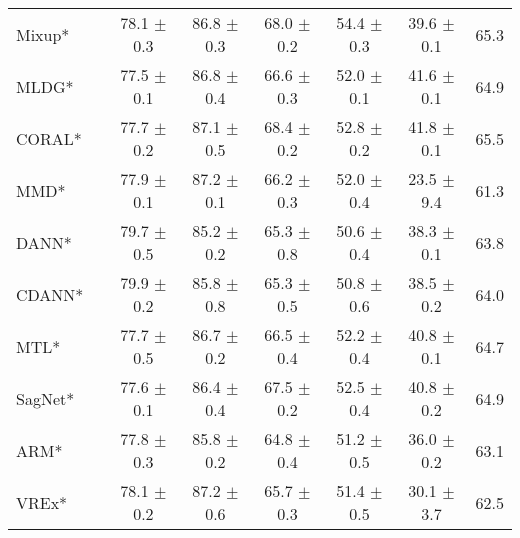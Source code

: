 \begin{table*}[t]
\begin{tabular}{llcccccc}
Mixup*               &   \citep{yan2020improve}            		 & 78.1 $\pm$ 0.3            & 86.8 $\pm$ 0.3            & 68.0 $\pm$ 0.2            & 54.4 $\pm$ 0.3            & 39.6 $\pm$ 0.1            & 65.3                      \\
MLDG*                 &  \citep{LiYSH18}           				& 77.5 $\pm$ 0.1            & 86.8 $\pm$ 0.4            & 66.6 $\pm$ 0.3            & 52.0 $\pm$ 0.1            & 41.6 $\pm$ 0.1            & 64.9                      \\
CORAL*                &  \citep{SunS16}           			  & 77.7 $\pm$ 0.2            & 87.1 $\pm$ 0.5            & 68.4 $\pm$ 0.2            & 52.8 $\pm$ 0.2            & 41.8 $\pm$ 0.1            & 65.5                      \\
MMD*               &   \citep{LiPWK18}               			& 77.9 $\pm$ 0.1            & 87.2 $\pm$ 0.1            & 66.2 $\pm$ 0.3            & 52.0 $\pm$ 0.4            & 23.5 $\pm$ 9.4            & 61.3                      \\
DANN*              &  \citep{GaninUAGLLML16}              		& 79.7 $\pm$ 0.5            & 85.2 $\pm$ 0.2            & 65.3 $\pm$ 0.8            & 50.6 $\pm$ 0.4            & 38.3 $\pm$ 0.1            & 63.8                      \\
CDANN*            &  \citep{LiTGLLZT18}              			& 79.9 $\pm$ 0.2            & 85.8 $\pm$ 0.8            & 65.3 $\pm$ 0.5            & 50.8 $\pm$ 0.6            & 38.5 $\pm$ 0.2            & 64.0                      \\
MTL*                  &  \citep{blanchard2017domain}           	  & 77.7 $\pm$ 0.5            & 86.7 $\pm$ 0.2            & 66.5 $\pm$ 0.4            & 52.2 $\pm$ 0.4            & 40.8 $\pm$ 0.1            & 64.7                      \\
SagNet*             &   \citep{nam2019reducing}           	& 77.6 $\pm$ 0.1            & 86.4 $\pm$ 0.4            & 67.5 $\pm$ 0.2            & 52.5 $\pm$ 0.4            & 40.8 $\pm$ 0.2            & 64.9                      \\
ARM*                  &   \citep{zhang2020adaptive}           		& 77.8 $\pm$ 0.3            & 85.8 $\pm$ 0.2            & 64.8 $\pm$ 0.4            & 51.2 $\pm$ 0.5            & 36.0 $\pm$ 0.2            & 63.1                      \\
VREx*                 &    \citep{krueger2020outofdistribution}       	  & 78.1 $\pm$ 0.2            & 87.2 $\pm$ 0.6            & 65.7 $\pm$ 0.3            & 51.4 $\pm$ 0.5            & 30.1 $\pm$ 3.7            & 62.5                      \\

\end{tabular}
\end{table*}

